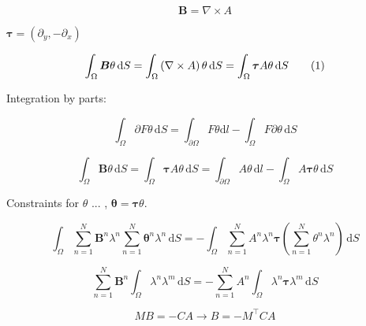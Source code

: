 \begin{equation} \label{eq:ap27}
\bm{B} = \nabla \times A
\end{equation}

\noindent  $\bm{\tau} = \left(\partial_y,-\partial_x\right)$

\begin{equation} \label{eq:ap28}
\int_{\Omega} \bm{B} \theta \,\mathrm{d}S = \int_{\Omega} \left( \nabla \times A \right) \theta \,\mathrm{d}S
= \int_{\Omega} \bm{\tau} A \theta \,\mathrm{d}S \numberthis 
\end{equation}

\noindent Integration by parts:

\begin{equation} \label{eq:ap29}
\int_{\Omega} \partial F \theta \,\mathrm{d}S = \int_{\partial\Omega}  F \theta \mathrm{d}l  - \int_{\Omega} F \partial \theta \,\mathrm{d}S
\end{equation}

\begin{equation} \label{eq:ap30}
\int_{\Omega} \bm{B} \theta \,\mathrm{d}S = \int_{\Omega} \bm{\tau} A \theta \,\mathrm{d}S = \int_{\partial\Omega} A \theta \,\mathrm{d}l - \int_{\Omega} A \bm{\tau} \theta \,\mathrm{d}S
\end{equation}

\noindent Constraints for $\theta$ ... , $\bm{\theta} = \bm{\tau} \theta$.

\begin{equation} \label{eq:ap40} \int_{\Omega} \sum_{n=1}^{N} \bm{B}^n \lambda^n \sum_{n=1}^{N} \bm{\theta}^n \lambda^n \,\mathrm{d}S = -\int_{\Omega} \sum_{n=1}^{N} A^n \lambda^n  \bm{\tau} \left(  \sum_{n=1}^{N} \theta^n \lambda^n \right) \,\mathrm{d}S 
\end{equation}

\begin{equation} \label{eq:ap41} \sum_{n=1}^{N} \bm{B}^n \int_{\Omega} \lambda^n \lambda^m \,\mathrm{d}S =  -\sum_{n=1}^{N}  A^n \int_{\Omega} \lambda^n  \bm{\tau} \lambda^m  \,\mathrm{d}S 
\end{equation}

\begin{equation} \label{eq:ap42} M B = - C A \rightarrow B = - M^{\top} C A
\end{equation}
















